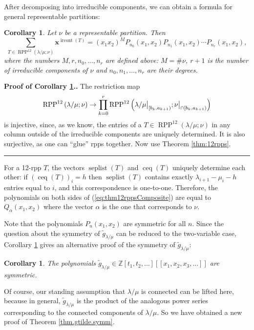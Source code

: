\documentclass[12pt]{article}
\theoremstyle{plain}
\newtheorem{corollary}[theorem]{Corollary}
\theoremstyle{definition}
\newenvironment{proof}[1][Proof]{\noindent\textbf{#1.} }{\ \rule{0.5em}{0.5em}}
\let\sumnonlimits\sum
\let\prodnonlimits\prod
\renewcommand{\sum}{\sumnonlimits\limits}
\renewcommand{\prod}{\prodnonlimits\limits}
\def\seplist{{\operatorname{seplist}}} %
\def\ceq{{\operatorname{ceq}}}
\def\ircont{{\operatorname{ircont}}}
\def\ceqvar{{{\alpha}}} %
\def\seplistvar{{{\nu}}} %
\def\g{{\widetilde{g}}}
\def\x{{\mathbf{x}}}
\def\lm{{\lambda/\mu}}
\def\Z{{\mathbb{Z}}}
\def\OneTwoRPPCutvar{{\operatorname{RPP}^{12}\left(  \lambda/\mu ;\seplistvar \right)}}
\begin{document}
After decomposing into irreducible components, we can obtain a formula for general representable partitions:
\begin{corollary}
\label{cor:thm12rppsCompositeCor}
 Let $\seplistvar$ be a representable partition. Then
  \begin{equation}
  \label{eq:thm12rppsComposite}
\sum_{T\in\OneTwoRPPCutvar} \x^{\ircont(T)}=(x_1x_2)^{M} P_{n_0}(x_1,x_2)P_{n_1}(x_1,x_2)\cdots P_{n_r}(x_1,x_2),
  \end{equation}
 where the numbers $M,r,n_0,\dots,n_r$ are defined above: $M=\#\seplistvar$, $r+1$ is the number of irreducible components of $\seplistvar$ and $n_0,n_1,\dots,n_r$ are their degrees.
\end{corollary}

\begin{proof}[Proof of Corollary \ref{cor:thm12rppsCompositeCor}.] The restriction map
\[
\OneTwoRPPCutvar \to \prod_{k=0}^r \operatorname{RPP}^{12}\left( \lm\big|_{[b_k,a_{k+1})} ; \nuxycap{b_k}{a_{k+1}}\right)
\]
is injective, since, as we know, the entries of a $T \in \OneTwoRPPCutvar$ in any column outside of the irreducible components are uniquely determined. It is also surjective, as one can ``glue'' rpps together. Now use Theorem \ref{thm:12rpps}.
\end{proof}

 For a 12-rpp $T$, the vectors $\seplist(T)$ and $\ceq(T)$ uniquely determine each other: if $(\ceq(T))_i=h$ then $\seplist(T)$ contains exactly $\lambda_{i+1}-\mu_i-h$ entries equal to $i$, and this correspondence is one-to-one. Therefore, the polynomials on both sides of (\ref{eq:thm12rppsComposite}) are equal to $Q_{\ceqvar}(x_1,x_2)$ where the vector $\ceqvar$ is the one that corresponds to $\seplistvar$.

 Note that the polynomials $P_n(x_1,x_2)$ are symmetric for all $n$. Since the question about the symmetry of $\g_\lm$ can be reduced to the two-variable case, Corollary \ref{cor:thm12rppsCompositeCor} gives an alternative proof of the symmetry of $\g_\lm$:
\begin{corollary}
 The polynomials $\g_\lm \in \Z[t_1,t_2,\dots]\left[[x_1, x_2, x_3, \ldots]\right]$ are symmetric.
\end{corollary}
 
 Of course, our standing assumption that $\lm$ is connected can be lifted here, because in general, $\g_\lm$ is the product of the analogous power series corresponding to the connected components of $\lm$. So we have obtained a new proof of Theorem \ref{thm.gtilde.symm}.
 
\end{document}
